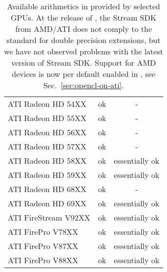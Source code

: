 \begin{table}[tb]
\begin{center}
\begin{tabular}{l|c|c}
ATI Radeon HD 54XX   & ok & - \\
ATI Radeon HD 55XX   & ok & - \\
ATI Radeon HD 56XX   & ok & - \\
ATI Radeon HD 57XX   & ok & - \\
ATI Radeon HD 58XX   & ok & essentially ok \\
ATI Radeon HD 59XX   & ok & essentially ok \\
ATI Radeon HD 68XX   & ok & - \\
ATI Radeon HD 69XX   & ok & essentially ok \\
ATI FireStream V92XX & ok & essentially ok \\
ATI FirePro V78XX    & ok & essentially ok \\
ATI FirePro V87XX    & ok & essentially ok \\
ATI FirePro V88XX    & ok & essentially ok \\
\end{tabular}
\caption{Available arithmetics in {\ViennaCL} provided by selected GPUs. At the
release of {\ViennaCLversion}, the Stream SDK from AMD/ATI does not comply to
the {\OpenCL} standard for double precision extensions, but we have not observed
problems with the latest version of Stream SDK. Support for AMD devices is now
per default enabled in {\ViennaCL}, see Sec.~\ref{sec:opencl-on-ati}.}
\label{tab:double-precision-GPUs}
\end{center}
\end{table}

